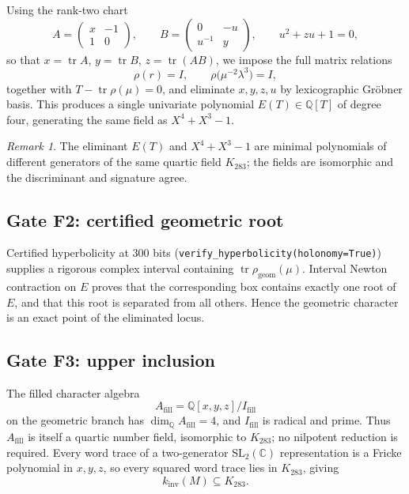 \documentclass[11pt,a4paper]{article}
\theoremstyle{definition}
\theoremstyle{remark}
\newtheorem{remark}[theorem]{Remark}
\newcommand{\tr}{\operatorname{tr}}
\newcommand{\kinv}{k_{\mathrm{inv}}}
\newcommand{\SLtwo}{\mathrm{SL}_2(\mathbb{C})}
\newcommand{\Q}{\mathbb{Q}}
\begin{document}
Using the rank-two chart
\begin{equation}
A = \begin{pmatrix} x & -1 \\ 1 & 0 \end{pmatrix},
\qquad
B = \begin{pmatrix} 0 & -u \\ u^{-1} & y \end{pmatrix},
\qquad u^2 + zu + 1 = 0,
\end{equation}
so that $x = \tr A$, $y = \tr B$, $z = \tr(AB)$, we impose the full
matrix relations
\begin{equation}
\rho(r) = I, \qquad \rho\bigl(\mu^{-2}\lambda^{3}\bigr) = I,
\end{equation}
together with $T - \tr\rho(\mu) = 0$, and eliminate
$x,y,z,u$ by lexicographic Gr\"obner basis. This produces a single
univariate polynomial $E(T) \in \Q[T]$ of degree four, generating
the same field as $X^4+X^3-1$.

\begin{remark}
The eliminant $E(T)$ and $X^4+X^3-1$ are minimal polynomials of
different generators of the same quartic field $K_{283}$; the fields
are isomorphic and the discriminant and signature agree.
\end{remark}

\subsection{Gate F2: certified geometric root}

Certified hyperbolicity at $300$ bits
(\texttt{verify\_hyperbolicity(holonomy=True)}) supplies a rigorous
complex interval containing $\tr\rho_{\mathrm{geom}}(\mu)$. Interval
Newton contraction on $E$ proves that the corresponding box contains
exactly one root of $E$, and that this root is separated from all
others. Hence the geometric character is an exact point of the
eliminated locus.

\subsection{Gate F3: upper inclusion}

The filled character algebra
\begin{equation}
A_{\mathrm{fill}} = \Q[x,y,z]/I_{\mathrm{fill}}
\end{equation}
on the geometric branch has $\dim_\Q A_{\mathrm{fill}} = 4$, and
$I_{\mathrm{fill}}$ is radical and prime. Thus $A_{\mathrm{fill}}$ is
itself a quartic number field, isomorphic to $K_{283}$; no nilpotent
reduction is required. Every word trace of a two-generator $\SLtwo$
representation is a Fricke polynomial in $x,y,z$, so every squared
word trace lies in $K_{283}$, giving
\begin{equation}
\kinv(M) \subseteq K_{283}.
\end{equation}
\end{document}
